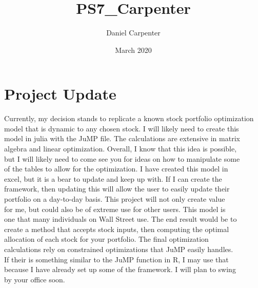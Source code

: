 \documentclass{article}
\title{PS7_Carpenter}
\author{Daniel Carpenter }
\date{March 2020}
\begin{document}
\maketitle

\section{Project Update}
    Currently, my decision stands to replicate a known stock portfolio optimization \\
    model that is dynamic to any chosen stock. I will likely need to create this \\
    model in julia with the JuMP file. The calculations are extensive in matrix \\
    algebra and linear optimization. Overall, I know that this idea is possible, \\
    but I will likely need to come see you for ideas on how to manipulate some \\
    of the tables to allow for the optimization. I have created this model in \\
    excel, but it is a bear to update and keep up with. If I can create the \\
    framework, then updating this will allow the user to easily update their \\
    portfolio on a day-to-day basis. This project will not only create value \\
    for me, but could also be of extreme use for other users. This model is \\
    one that many individuals on Wall Street use. The end result would be to \\
    create a method that accepts stock inputs, then computing the optimal \\
    allocation of each stock for your portfolio. The final optimization \\
    calculations rely on constrained optimizations that JuMP easily handles. \\
    If their is something similar to the JuMP function in R, I may use that \\
    because I have already set up some of the framework. I will plan to swing \\
    by your office soon.

\newpage
\end{document}
